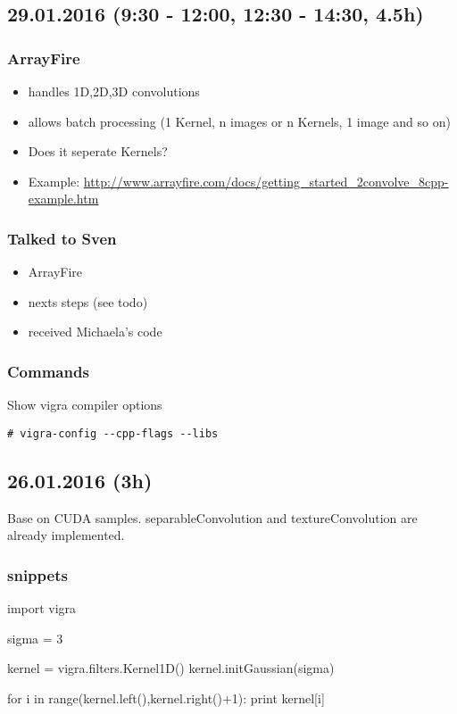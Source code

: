 \documentclass[12pt,a4paper]{article}
\begin{document}
\subsection{29.01.2016 (9:30 - 12:00, 12:30 - 14:30, 4.5h)}

  \subsubsection{ArrayFire}
    \begin{itemize}
      \item handles 1D,2D,3D convolutions
      \item allows batch processing (1 Kernel, n images or n Kernels, 1 image and so on)
      \item Does it seperate Kernels?
      \item Example: \url{http://www.arrayfire.com/docs/getting_started_2convolve_8cpp-example.htm}
    \end{itemize}

  \subsubsection{Talked to Sven}
    \begin{itemize}
      \item ArrayFire
      \item nexts steps (see todo)
      \item received Michaela's code
    \end{itemize}

  \subsubsection{Commands}

    Show vigra compiler options
    \begin{lstlisting}[style=BashInputStyle]
    # vigra-config --cpp-flags --libs 
    \end{lstlisting}

\subsection{26.01.2016 (3h)}

  Base on CUDA samples. separableConvolution and textureConvolution are already implemented.

  \subsubsection{snippets}
    \begin{python}[caption="print out gaussian 1D kernel"]
      import vigra

      sigma = 3

      kernel = vigra.filters.Kernel1D()
      kernel.initGaussian(sigma)
      
      for i in range(kernel.left(),kernel.right()+1):
	print kernel[i]
    \end{python}
\end{document}
